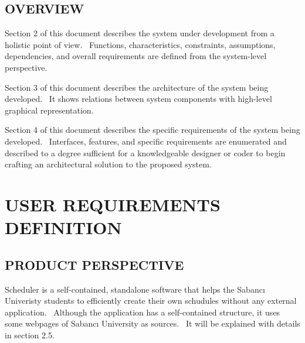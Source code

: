 \documentclass[twoside,letterpaper]{article}
\begin{document}
\clearpage

\subsection[OVERVIEW]{\rmfamily\bfseries\color{black}
OVERVIEW}

\begin{flushleft}{\color{black}
Section 2 of this document describes the system under development from a
holistic point of view. \ Functions, characteristics, constraints,
assumptions, dependencies, and overall requirements are defined from
the system-level perspective.}


\bigskip

{\color{black}
Section 3 of this document describes the architecture of the
system being developed. \ It shows relations between system components with high-level graphical representation.}


\bigskip

{\color{black}
Section 4 of this document describes the specific requirements of the
system being developed. \ Interfaces, features, and specific
requirements are enumerated and described to a degree sufficient for a
knowledgeable designer or coder to begin crafting an architectural
solution to the proposed system.}

\end{flushleft}

\clearpage\section[USER REQUIREMENTS DEFINITION]{\rmfamily\bfseries\color{black}
USER REQUIREMENTS DEFINITION}

\subsection[PRODUCT
PERSPECTIVE]{\rmfamily\bfseries\color{black}
PRODUCT PERSPECTIVE}

{\color{black}
Scheduler is a self-contained, standalone software that helps the Sabanc\i{} Univeristy students to efficiently create their own schudules without any external application. \ Although the application has a self-contained structure, it uses some webpages of Sabanc\i{} University as sources. \ It will be explained with details in section 2.5.}
\end{document}
